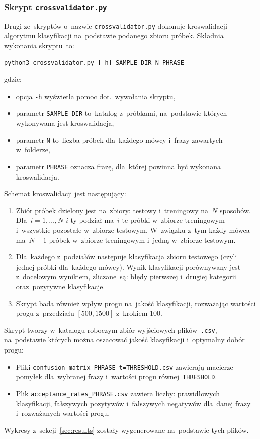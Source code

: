 \documentclass[11pt,a4paper]{article}
\begin{document}
\subsubsection{Skrypt \texttt{crossvalidator.py}}

Drugi ze~skryptów o~nazwie \texttt{crossvalidator.py} dokonuje kroswalidacji algorytmu klasyfikacji na~podstawie podanego zbioru próbek.
Składnia wykonania skryptu~to:
\begin{verbatim}
python3 crossvalidator.py [-h] SAMPLE_DIR N PHRASE
\end{verbatim}
gdzie:
\begin{itemize}
    \item opcja \texttt{-h} wyświetla pomoc dot.~wywołania skryptu,
    \item parametr \texttt{SAMPLE\_DIR} to~katalog z~próbkami, na~podstawie których wykonywana jest kroswalidacja,
    \item parametr \texttt{N} to~liczba próbek dla~każdego mówcy i~frazy zawartych w~folderze,
    \item parametr \texttt{PHRASE} oznacza frazę, dla~której powinna być wykonana kroswalidacja.
\end{itemize}
Schemat kroswalidacji jest następujący:
\begin{enumerate}
    \item Zbiór próbek dzielony jest na~zbiory: testowy i~treningowy na~$N$ sposobów.
        Dla~$i = 1, \dots, N$ $i$-ty podział ma~$i$-te próbki w~zbiorze treningowym i~wszystkie pozostałe w~zbiorze testowym.
        W~związku z~tym każdy mówca ma~$N - 1$ próbek w~zbiorze treningowym i~jedną w~zbiorze testowym.
    \item Dla~każdego z~podziałów następuje klasyfikacja zbioru testowego (czyli jednej próbki dla~każdego mówcy).
        Wynik klasyfikacji porównywany jest z~docelowym wynikiem, zliczane~są: błędy pierwszej i~drugiej kategorii oraz~pozytywne klasyfikacje.
    \item Skrypt bada również wpływ progu na~jakość klasyfikacji, rozważając wartości progu z~przedziału $[500, 1500]$ z~krokiem 100.
\end{enumerate}
Skrypt tworzy w~katalogu roboczym zbiór wyjściowych plików~\texttt{.csv}, na~podstawie których można oszacować jakość klasyfikacji i~optymalny dobór progu:
\begin{itemize}
    \item Pliki \texttt{confusion\_matrix\_PHRASE\_t=THRESHOLD.csv} zawierają macierze pomyłek dla~wybranej frazy i~wartości progu równej~\texttt{THRESHOLD}.
    \item Plik \texttt{acceptance\_rates\_PHRASE.csv} zawiera liczby: prawidłowych klasyfikacji, fałszywych pozytywów i~fałszywych negatywów dla~danej frazy i~rozważanych wartości progu.
\end{itemize}
Wykresy z~sekcji~\ref{sec:results} zostały wygenerowane na~podstawie tych plików.
\end{document}
